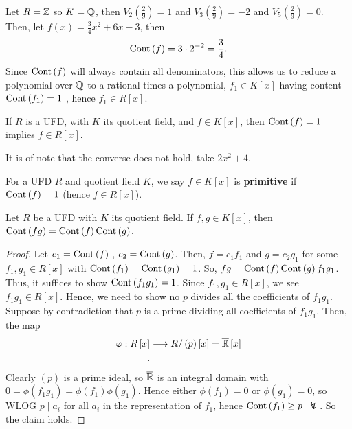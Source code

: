 \begin{example}
	Let \(R = \mathbb{Z}\) so \(K = \mathbb{Q}\), then \(V_{2}\left( \frac{2}{9} \right)  = 1\) and \(V_{3}\left( \frac{2}{9} \right) = -2 \) and \(V_{5}\left( \frac{2}{9} \right) = 0 \).\\
	Then, let \(f\left( x \right)  = \frac{3}{4}x^2 + 6x -3\), then \[
	\operatorname{Cont} \left( f \right) = 3 \cdot 2^{-2} = \frac{3}{4}
	.\]
	Since \(\operatorname{Cont}\left( f \right) \) will always contain all denominators, this allows us to reduce a polynomial over \(\mathbb{Q}\) to a rational times a polynomial, \(f_1 \in K\left[ x \right] \) having content \(\operatorname{Cont}\left( f_1 \right) = 1\) , hence \(f_1 \in R\left[ x \right] \).
\end{example}
\begin{lemma}
	If \(R\) is a UFD, with \(K\) its quotient field, and \(f \in K\left[ x \right] \), then \(\operatorname{Cont}\left( f \right)  = 1\) implies \(f \in R\left[ x \right] \).
\end{lemma}
\begin{remark}
	It is of note that the converse does not hold, take \(2x^2 + 4\).
\end{remark}
\begin{definition}
	For a UFD \(R\) and quotient field \(K\), we say \(f \in K\left[ x \right] \) is \textbf{primitive} if \(\operatorname{Cont} \left( f \right)  = 1\) (hence \(f \in R\left[ x \right] \)).
\end{definition}
\begin{lemma}
	Let \(R\) be a UFD with \(K\) its quotient field. If \(f, g \in K\left[ x \right] \), then \(\operatorname{Cont}\left( fg \right) = \operatorname{Cont}\left( f \right) \operatorname{Cont}\left( g \right) \).
\end{lemma}
\begin{proof}
	Let \(c_1 = \operatorname{Cont}\left( f \right) \) , \(c_2 =\operatorname{Cont}\left( g \right) \). Then, \(f = c_1 f_1\) and \(g = c_2 g_1\) for some \(f_1, g_1 \in R\left[ x \right] \) with \(\operatorname{Cont}\left( f_1 \right)  = \operatorname{Cont}\left( g_1 \right)  = 1\). So, \(fg = \operatorname{Cont}\left( f \right) \operatorname{Cont}\left( g \right) f_1g_1\).\\
	Thus, it suffices to show \(\operatorname{Cont}\left( f_1g_1 \right) = 1 \). Since \(f_1, g_1 \in R\left[ x \right]  \), we see \(f_1g_1 \in R\left[ x \right] \). Hence, we need to show no \(p\) divides all the coefficients of \(f_1g_1\). Suppose by contradiction that \(p\) is a prime dividing all coefficients of \(f_1g_1\). Then, the map \begin{align*}
		\varphi: R\left[ x \right]  &\longrightarrow R / \left( p \right) \left[ x \right]   = \overline{\mathbb{R}}\left[ x \right] \\
	.\end{align*}
Clearly \(\left( p \right) \) is a prime ideal, so \(\overline{\mathbb{R}}\) is an integral domain with \( 0 = \phi\left( f_1g_1 \right) = \phi\left( f_1 \right) \phi\left( g_1 \right) \). Hence either \(\phi\left( f_1 \right) = 0\) or \(\phi\left( g_1 \right) = 0\), so WLOG \(p \mid a_{i}\) for all \(a_{i}\) in the representation of \(f_1\), hence \(\operatorname{Cont}\left( f_1 \right) \ge p \) \(\lightning\). So the claim holds.
\end{proof}
